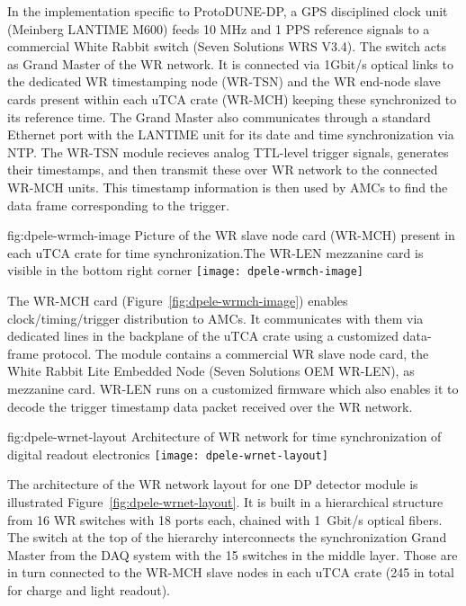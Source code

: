 In the implementation specific to ProtoDUNE-DP, a GPS disciplined clock unit (Meinberg LANTIME M600) feeds 10 MHz and 1 PPS reference signals to a commercial White Rabbit switch (Seven Solutions WRS V3.4). The switch acts as Grand Master of the WR network. It is connected via 1Gbit/s optical links to the dedicated WR timestamping node (WR-TSN) and the WR end-node slave cards present within each uTCA crate (WR-MCH) keeping these synchronized to its reference time. The Grand Master also communicates through a standard Ethernet port with the LANTIME unit for its date and time synchronization via NTP. The WR-TSN module recieves analog TTL-level trigger signals, generates their timestamps, and then transmit these over WR network to the connected WR-MCH units. This timestamp information is then used by AMCs to find the data frame corresponding to the trigger. 

\begin{dunefigure}{fig:dpele-wrmch-image}
{Picture of the WR slave node card (WR-MCH) present in each uTCA crate for time synchronization.The WR-LEN mezzanine card is visible in the bottom right corner}
\texttt{[image: dpele-wrmch-image]}
\end{dunefigure}

The WR-MCH card (Figure~\ref{fig:dpele-wrmch-image}) enables clock/timing/trigger distribution to AMCs. It communicates with them via dedicated lines in the backplane of the uTCA crate using a customized data-frame protocol. The module contains a commercial WR slave node card, the White Rabbit Lite Embedded Node (Seven Solutions OEM WR-LEN), as mezzanine card. WR-LEN runs on a customized firmware which also enables it to decode the trigger timestamp data packet received over the WR network.

\begin{dunefigure}{fig:dpele-wrnet-layout}
{Architecture of WR network for time synchronization of digital readout electronics}
\texttt{[image: dpele-wrnet-layout]}
\end{dunefigure}

The architecture of the WR network layout for one DP detector module is illustrated Figure~\ref{fig:dpele-wrnet-layout}. It is built in a hierarchical structure from \num{16} WR switches with \num{18} ports each,  chained with \SI{1}{Gbit/s} optical fibers. The switch at the top of the hierarchy interconnects the synchronization Grand Master from the DAQ system with the \num{15} switches in the middle layer. Those are in turn connected to the WR-MCH slave nodes in each uTCA crate (245 in total for charge and light readout). 


